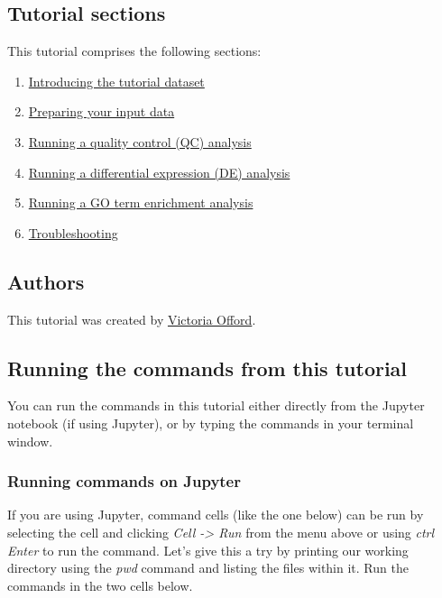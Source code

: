 \documentclass[11pt]{article}
\providecommand{\tightlist}{%
      \setlength{\itemsep}{0pt}\setlength{\parskip}{0pt}}
\begin{document}
\hypertarget{tutorial-sections}{%
\subsection{Tutorial sections}\label{tutorial-sections}}

This tutorial comprises the following sections:

\begin{enumerate}
\def\labelenumi{\arabic{enumi}.}
\tightlist
\item
  \href{introduction.ipynb}{Introducing the tutorial dataset}
\item
  \href{input-data.ipynb}{Preparing your input data}
\item
  \href{quality-control.ipynb}{Running a quality control (QC) analysis}
\item
  \href{differential-expression.ipynb}{Running a differential expression
  (DE) analysis}
\item
  \href{go-term-enrichment.ipynb}{Running a GO term enrichment analysis}
\item
  \href{troubleshooting.ipynb}{Troubleshooting}
\end{enumerate}

\hypertarget{authors}{%
\subsection{Authors}\label{authors}}

This tutorial was created by \href{https://github.com/vaofford}{Victoria
Offord}.

\hypertarget{running-the-commands-from-this-tutorial}{%
\subsection{Running the commands from this
tutorial}\label{running-the-commands-from-this-tutorial}}

You can run the commands in this tutorial either directly from the
Jupyter notebook (if using Jupyter), or by typing the commands in your
terminal window.

\hypertarget{running-commands-on-jupyter}{%
\subsubsection{Running commands on
Jupyter}\label{running-commands-on-jupyter}}

If you are using Jupyter, command cells (like the one below) can be run
by selecting the cell and clicking \textit{Cell -\textgreater{} Run} from
the menu above or using \textit{ctrl Enter} to run the command. Let's give
this a try by printing our working directory using the \textit{pwd}
command and listing the files within it. Run the commands in the two
cells below.
\end{document}
